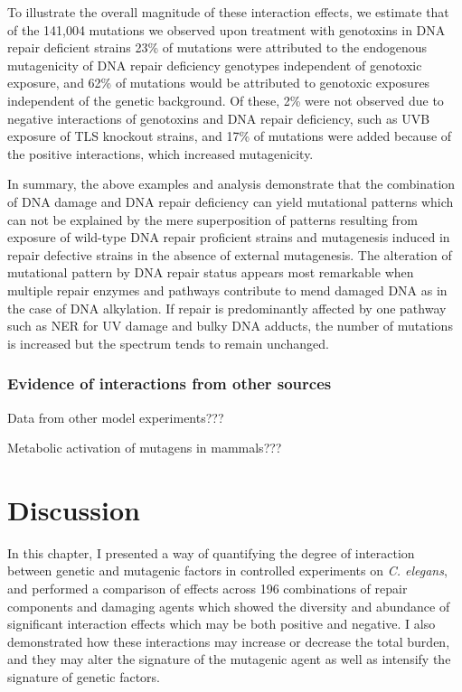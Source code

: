 To illustrate the overall magnitude of these interaction effects, we estimate that of the 141,004 mutations we observed upon treatment with genotoxins in DNA repair deficient strains 23\% of mutations were attributed to the endogenous mutagenicity of DNA repair deficiency genotypes independent of genotoxic exposure, and 62\% of mutations would be attributed to genotoxic exposures independent of the genetic background. Of these, 2\% were not observed due to negative interactions of genotoxins and DNA repair deficiency, such as UVB exposure of TLS knockout strains, and 17\% of mutations were added because of the positive interactions, which increased mutagenicity.

In summary, the above examples and analysis demonstrate that the combination of DNA damage and DNA repair deficiency can yield mutational patterns which can not be explained by the mere superposition of patterns resulting from exposure of wild-type DNA repair proficient strains and mutagenesis induced in repair defective strains in the absence of external mutagenesis. The alteration of mutational pattern by DNA repair status appears most remarkable when multiple repair enzymes and pathways contribute to mend damaged DNA as in the case of DNA alkylation. If repair is predominantly affected by one pathway such as NER for UV damage and bulky DNA adducts, the number of mutations is increased but the spectrum tends to remain unchanged.

\subsubsection*{Evidence of interactions from other sources}

Data from other model experiments???

Metabolic activation of mutagens in mammals???



\section{Discussion}

In this chapter, I presented a way of quantifying the degree of interaction between
genetic and mutagenic factors in controlled experiments on \textit{C. elegans}, and performed
a comparison of effects across 196 combinations of repair components and damaging agents
which showed the diversity and abundance of significant interaction effects which may
be both positive and negative. I also demonstrated how these interactions may increase
or decrease the total burden, and they may alter the signature of the mutagenic agent
as well as intensify the signature of genetic factors.

